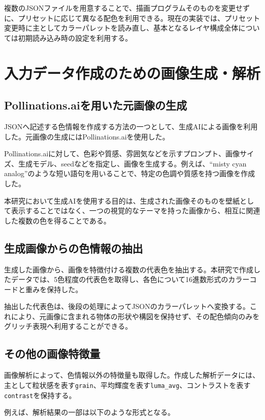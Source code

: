 複数のJSONファイルを用意することで、描画プログラムそのものを変更せずに、プリセットに応じて異なる配色を利用できる。現在の実装では、プリセット変更時に主としてカラーパレットを読み直し、基本となるレイヤ構成全体については初期読み込み時の設定を利用する。


\section{入力データ作成のための画像生成・解析}

\subsection{Pollinations.aiを用いた元画像の生成}

JSONへ記述する色情報を作成する方法の一つとして、生成AIによる画像を利用した。元画像の生成にはPollinations.aiを使用した。

Pollinations.aiに対して、色彩や質感、雰囲気などを示すプロンプト、画像サイズ、生成モデル、seedなどを指定し、画像を生成する。例えば、``misty cyan analog''のような短い語句を用いることで、特定の色調や質感を持つ画像を作成した。

本研究において生成AIを使用する目的は、生成された画像そのものを壁紙として表示することではなく、一つの視覚的なテーマを持った画像から、相互に関連した複数の色を得ることである。


\subsection{生成画像からの色情報の抽出}

生成した画像から、画像を特徴付ける複数の代表色を抽出する。本研究で作成したデータでは、5色程度の代表色を取得し、各色について16進数形式のカラーコードと重みを保持した。

抽出した代表色は、後段の処理によってJSONのカラーパレットへ変換する。これにより、元画像に含まれる物体の形状や構図を保持せず、その配色傾向のみをグリッチ表現へ利用することができる。


\subsection{その他の画像特徴量}

画像解析によって、色情報以外の特徴量も取得した。作成した解析データには、主として粒状感を表す\texttt{grain}、平均輝度を表す\texttt{luma\_avg}、コントラストを表す\texttt{contrast}を保持する。

例えば、解析結果の一部は以下のような形式となる。

